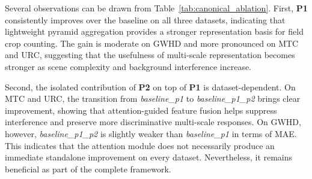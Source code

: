 \documentclass[a4paper,fleqn]{cas-sc}
\begin{document}
\begin{table}[!htbp]
    \centering
    \caption{Canonical ablation results of Light-FCCNet on GWHD, MTC, and URC. Lower values indicate better performance.}
    \label{tab:canonical_ablation}
\end{table}

Several observations can be drawn from Table~\ref{tab:canonical_ablation}. First, \textbf{P1} consistently improves over the baseline on all three datasets, indicating that lightweight pyramid aggregation provides a stronger representation basis for field crop counting. The gain is moderate on GWHD and more pronounced on MTC and URC, suggesting that the usefulness of multi-scale representation becomes stronger as scene complexity and background interference increase.

Second, the isolated contribution of \textbf{P2} on top of \textbf{P1} is dataset-dependent. On MTC and URC, the transition from \textit{baseline\_p1} to \textit{baseline\_p1\_p2} brings clear improvement, showing that attention-guided feature fusion helps suppress interference and preserve more discriminative multi-scale responses. On GWHD, however, \textit{baseline\_p1\_p2} is slightly weaker than \textit{baseline\_p1} in terms of MAE. This indicates that the attention module does not necessarily produce an immediate standalone improvement on every dataset. Nevertheless, it remains beneficial as part of the complete framework.
\end{document}
